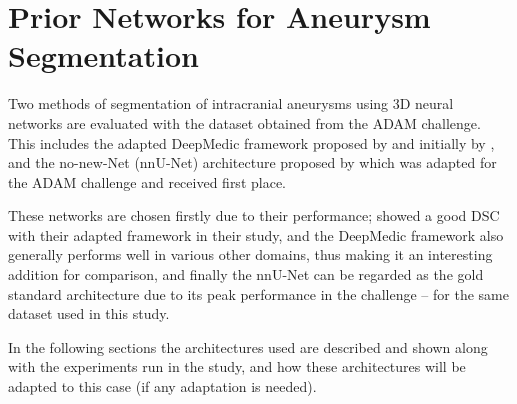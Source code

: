 \section{Prior Networks for Aneurysm Segmentation}
\label{chapter4}


Two methods of segmentation of intracranial aneurysms using 3D neural networks are evaluated with the dataset obtained from the ADAM challenge. This includes the adapted DeepMedic framework proposed by \citeauthor{Sichermann2019} and initially by \citeauthor{Kamnitsas2017}, and the no-new-Net (nnU-Net) architecture proposed by \citeauthor{nnUnet} which was adapted for the ADAM challenge and received first place. 

These networks are chosen firstly due to their performance; \citeauthor{Sichermann2019} showed a good DSC with their adapted framework in their study, and the DeepMedic framework also generally performs well in various other domains, thus making it an interesting addition for comparison, and finally the nnU-Net can be regarded as the gold standard architecture due to its peak performance in the challenge -- for the same dataset used in this study.

In the following sections the architectures used are described and shown along with the experiments run in the study, and how these architectures will be adapted to this case (if any adaptation is needed). 

%
%


